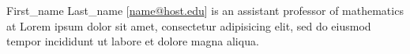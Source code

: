 \documentclass{article}
\begin{document}
\printnotes




 
\begin{info}
First\_name Last\_name [\url{name@host.edu}] is an assistant professor of mathematics at Lorem ipsum dolor sit amet, consectetur adipisicing elit, sed do eiusmod tempor incididunt ut labore et dolore magna aliqua.

\end{info}
\end{document}
